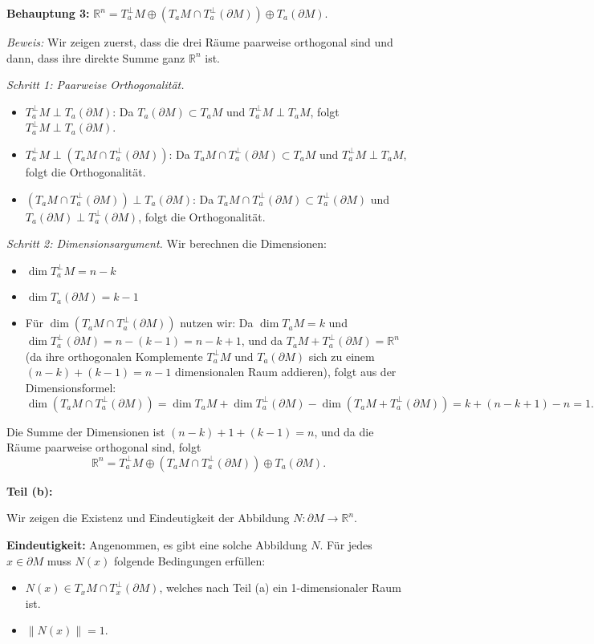 \documentclass{article}
\newcommand{\R}{\mathbb{R}}
\newcommand{\del}{\partial}
\begin{document}
\textbf{Behauptung 3:} $\R^n = T_a^{\perp} M \oplus (T_a M \cap T_a^{\perp}(\del M)) \oplus T_a(\del M)$.

\textit{Beweis:} Wir zeigen zuerst, dass die drei Räume paarweise orthogonal sind und dann, dass ihre direkte Summe ganz $\R^n$ ist.

\textit{Schritt 1: Paarweise Orthogonalität.}
\begin{itemize}
\item $T_a^{\perp} M \perp T_a(\del M)$: Da $T_a(\del M) \subset T_a M$ und $T_a^{\perp} M \perp T_a M$, folgt $T_a^{\perp} M \perp T_a(\del M)$.

\item $T_a^{\perp} M \perp (T_a M \cap T_a^{\perp}(\del M))$: Da $T_a M \cap T_a^{\perp}(\del M) \subset T_a M$ und $T_a^{\perp} M \perp T_a M$, folgt die Orthogonalität.

\item $(T_a M \cap T_a^{\perp}(\del M)) \perp T_a(\del M)$: Da $T_a M \cap T_a^{\perp}(\del M) \subset T_a^{\perp}(\del M)$ und $T_a(\del M) \perp T_a^{\perp}(\del M)$, folgt die Orthogonalität.
\end{itemize}

\textit{Schritt 2: Dimensionsargument.}
Wir berechnen die Dimensionen:
\begin{itemize}
\item $\dim T_a^{\perp} M = n-k$
\item $\dim T_a(\del M) = k-1$
\item Für $\dim(T_a M \cap T_a^{\perp}(\del M))$ nutzen wir: Da $\dim T_a M = k$ und $\dim T_a^{\perp}(\del M) = n-(k-1) = n-k+1$, und da $T_a M + T_a^{\perp}(\del M) = \R^n$ (da ihre orthogonalen Komplemente $T_a^{\perp} M$ und $T_a(\del M)$ sich zu einem $(n-k) + (k-1) = n-1$ dimensionalen Raum addieren), folgt aus der Dimensionsformel:
\[
\dim(T_a M \cap T_a^{\perp}(\del M)) = \dim T_a M + \dim T_a^{\perp}(\del M) - \dim(T_a M + T_a^{\perp}(\del M)) = k + (n-k+1) - n = 1.
\]
\end{itemize}

Die Summe der Dimensionen ist $(n-k) + 1 + (k-1) = n$, und da die Räume paarweise orthogonal sind, folgt
\[
\R^n = T_a^{\perp} M \oplus (T_a M \cap T_a^{\perp}(\del M)) \oplus T_a(\del M).
\]

\textbf{Teil (b):}

Wir zeigen die Existenz und Eindeutigkeit der Abbildung $N: \del M \to \R^n$.

\textbf{Eindeutigkeit:} 
Angenommen, es gibt eine solche Abbildung $N$. Für jedes $x \in \del M$ muss $N(x)$ folgende Bedingungen erfüllen:
\begin{itemize}
\item $N(x) \in T_x M \cap T_x^{\perp}(\del M)$, welches nach Teil (a) ein 1-dimensionaler Raum ist.
\item $\|N(x)\| = 1$.
\end{itemize}
\end{document}

